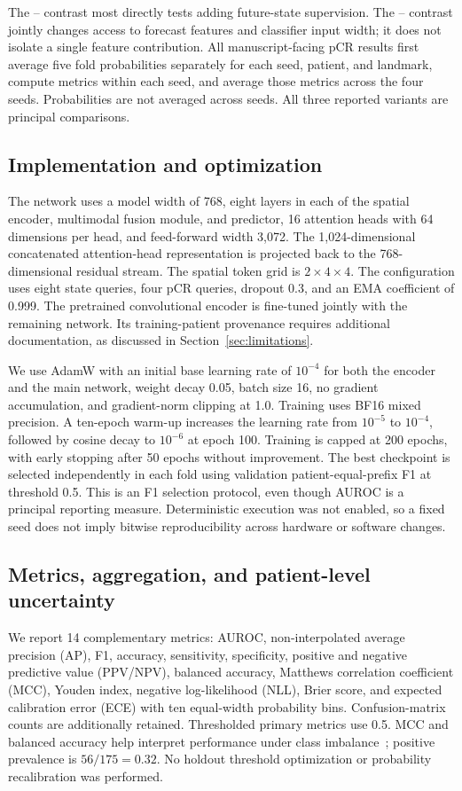The \direct{}--\nojepa{} contrast most directly tests adding future-state supervision. The \fullmodel{}--\direct{} contrast jointly changes access to forecast features and classifier input width; it does not isolate a single feature contribution. All manuscript-facing pCR results first average five fold probabilities separately for each seed, patient, and landmark, compute metrics within each seed, and average those metrics across the four seeds. Probabilities are not averaged across seeds. All three reported variants are principal comparisons.

\subsection{Implementation and optimization}
The network uses a model width of 768, eight layers in each of the spatial encoder, multimodal fusion module, and predictor, 16 attention heads with 64 dimensions per head, and feed-forward width 3,072. The 1,024-dimensional concatenated attention-head representation is projected back to the 768-dimensional residual stream. The spatial token grid is $2\times4\times4$. The configuration uses eight state queries, four pCR queries, dropout 0.3, and an EMA coefficient of 0.999. The pretrained convolutional encoder is fine-tuned jointly with the remaining network. Its training-patient provenance requires additional documentation, as discussed in Section~\ref{sec:limitations}.

We use AdamW \citep{adamw2019} with an initial base learning rate of $10^{-4}$ for both the encoder and the main network, weight decay 0.05, batch size 16, no gradient accumulation, and gradient-norm clipping at 1.0. Training uses BF16 mixed precision. A ten-epoch warm-up increases the learning rate from $10^{-5}$ to $10^{-4}$, followed by cosine decay to $10^{-6}$ at epoch 100. Training is capped at 200 epochs, with early stopping after 50 epochs without improvement. The best checkpoint is selected independently in each fold using validation patient-equal-prefix F1 at threshold 0.5. This is an F1 selection protocol, even though AUROC is a principal reporting measure. Deterministic execution was not enabled, so a fixed seed does not imply bitwise reproducibility across hardware or software changes.

\subsection{Metrics, aggregation, and patient-level uncertainty}
We report 14 complementary metrics: AUROC, non-interpolated average precision (AP), F1, accuracy, sensitivity, specificity, positive and negative predictive value (PPV/NPV), balanced accuracy, Matthews correlation coefficient (MCC), Youden index, negative log-likelihood (NLL), Brier score, and expected calibration error (ECE) with ten equal-width probability bins. Confusion-matrix counts are additionally retained. Thresholded primary metrics use 0.5. MCC and balanced accuracy help interpret performance under class imbalance~\citep{chicco2020mcc}; positive prevalence is $56/175=0.32$. No holdout threshold optimization or probability recalibration was performed.

